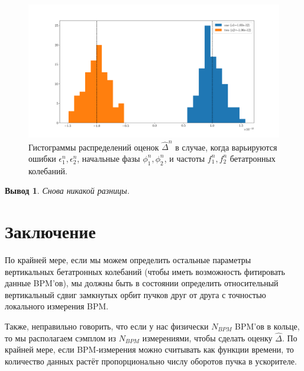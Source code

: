 \documentclass[12pt]{report}
\newcommand{\ntrl}{n}
\newtheorem{concl}{Вывод}
\begin{document}
\begin{figure}[h]\centering
	\includegraphics[width=\linewidth]{../../img/Koop/CO_offset_b1_b2_hist_vary_+phis+freqs}
	\caption{Гистограммы распределений оценок $\hat{\Delta}^{\ntrl}$ в случае, когда варьируются ошибки $\epsilon_1^{\ntrl},\epsilon_2^{\ntrl}$, начальные фазы $\phi_1^{\ntrl},\phi_2^{\ntrl}$, и частоты $f_1^{\ntrl},f_2^{\ntrl}$ бетатронных колебаний. \label{fig:vary_+phis+freqs}}
\end{figure}

\begin{concl}
	Снова никакой разницы.
\end{concl}

\section{Заключение}
По крайней мере, если мы можем определить остальные параметры вертикальных бетатронных колебаний (чтобы иметь возможность фитировать данные BPM'ов), мы должны быть в состоянии определить относительный вертикальный сдвиг замкнутых орбит пучков друг от друга с точностью локального измерения BPM.

Также, неправильно говорить, что если у нас физически $N_{BPM}$ BPM'ов в кольце, то мы располагаем сэмплом из $N_{BPM}$ измерениями, чтобы сделать оценку $\hat{\Delta}$. По крайней мере, если BPM-измерения можно считывать как функции времени, то количество данных растёт пропорционально числу оборотов пучка в ускорителе.
\end{document}
